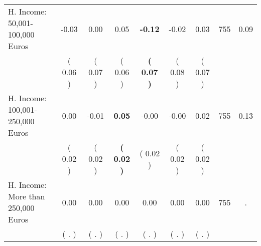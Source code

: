 \begin{tabular}{lcccccccc}
H. Income: 50,001-100,000 Euros &     -0.03 &      0.00 &      0.05 & \textbf{    -0.12} &     -0.02 &      0.03 & 755 &       0.09 \\ 
 & (     0.06 ) & (     0.07 ) & (     0.06 ) & \textbf{(     0.07 )} & (     0.08 ) & (     0.07 ) & \\
H. Income: 100,001-250,000 Euros &      0.00 &     -0.01 & \textbf{     0.05} &     -0.00 &     -0.00 &      0.02 & 755 &       0.13 \\ 
 & (     0.02 ) & (     0.02 ) & \textbf{(     0.02 )} & (     0.02 ) & (     0.02 ) & (     0.02 ) & \\
H. Income: More than 250,000 Euros &      0.00 &      0.00 &      0.00 &      0.00 &      0.00 &      0.00 & 755 &          . \\ 
 & (        . ) & (        . ) & (        . ) & (        . ) & (        . ) & (        . ) & \\
\bottomrule
\end{tabular}
